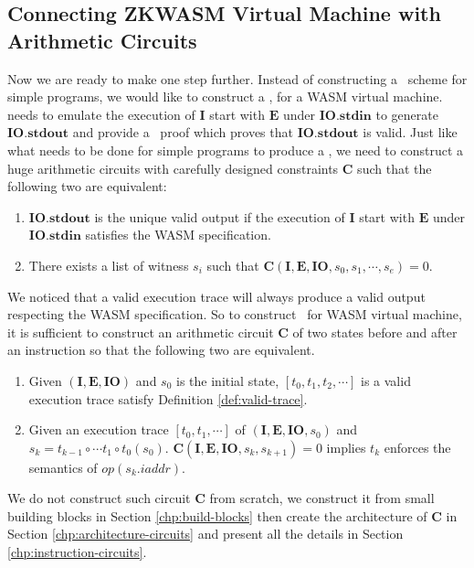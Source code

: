 \subsection{Connecting ZKWASM Virtual Machine with Arithmetic Circuits}
\label{chp:encode-state-in-circuits}
Now we are ready to make one step further. Instead of constructing a \zksnark\, scheme for simple programs, we would like to construct a \zksnark, for a WASM virtual machine. \zkwasm\,  needs to emulate the execution of $\mathbf{I}$ start with $\mathbf{E}$ under $\mathbf{IO.\mathbf{stdin}}$ to generate $\mathbf{IO.\mathbf{stdout}}$ and provide a \zksnark\, proof which proves that $\mathbf{IO.\mathbf{stdout}}$ is valid. Just like what needs to be done for simple programs to produce a \zksnark, we need to construct a huge arithmetic circuits with carefully designed constraints $\mathbf{C}$ such that the following two are equivalent:
\begin{enumerate}[leftmargin=*]
\item $\mathbf{IO.\mathbf{stdout}}$ is the unique valid output if the execution of $\mathbf{I}$ start with $\mathbf{E}$ under $\mathbf{IO.\mathbf{stdin}}$ satisfies the WASM specification.

\item There exists a list of witness $s_i$ such that $\mathbf{C}(\mathbf{I}, \mathbf{E}, \mathbf{IO}, s_0, s_1,\cdots, s_e) = 0$.
\end{enumerate}

We noticed that a valid execution trace will always produce a valid output respecting the WASM specification. So to construct \zksnark\, for WASM virtual machine, it is sufficient to construct an arithmetic circuit $\mathbf{C}$ of two states before and after an instruction so that the following two are equivalent.
\begin{enumerate}[leftmargin=*]
\item Given $(\mathbf{I}, \mathbf{E}, \mathbf{IO})$ and $s_0$ is the initial state, $\left[t_0, t_1, t_2, \cdots \right]$ is a valid execution trace satisfy Definition \ref{def:valid-trace}.
\item Given an execution trace $\left[t_0, t_1, \cdots \right]$ of $(\mathbf{I}, \mathbf{E}, \mathbf{IO}, s_0)$ and $s_k = t_{k-1} \circ \cdots t_1 \circ t_0 (s_0)$. $\mathbf{C}(\mathbf{I}, \mathbf{E}, \mathbf{IO}, s_k, s_{k+1}) = 0$ implies $t_k$ enforces the semantics of $op(s_k.iaddr)$.
\end{enumerate}

We do not construct such circuit $\mathbf{C}$ from scratch, we construct it from small building blocks in Section \ref{chp:build-blocks} then create the architecture of $\mathbf{C}$ in Section \ref{chp:architecture-circuits} and present all the details in Section \ref{chp:instruction-circuits}.
 
